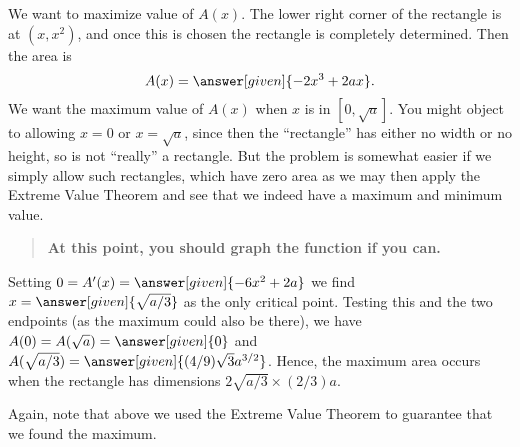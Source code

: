\documentclass{ximera}
\begin{document}
\begin{example}
\begin{image}
\end{image}
\begin{explanation}
We want to maximize value of $A(x)$.  The lower right corner of the
rectangle is at $(x,x^2)$, and once this is chosen the rectangle is
completely determined. Then the area is
\[
A(x)=\answer[given]{-2x^3+2ax}.
\] 
We want the maximum value of $A(x)$ when $x$ is in $[0,\sqrt{a}]$. You
might object to allowing $x=0$ or $x=\sqrt{a}$, since then the
``rectangle'' has either no width or no height, so is not ``really'' a
rectangle. But the problem is somewhat easier if we simply allow such
rectangles, which have zero area as we may then apply the Extreme
Value Theorem and see that we indeed have a maximum and minimum value.
\begin{quote}
  \textbf{At this point, you should graph the function if you can.}
\end{quote}
Setting $0=A'(x)=\answer[given]{-6x^2+2a}$ we find
$x=\answer[given]{\sqrt{a/3}}$ as the only critical point. Testing
this and the two endpoints (as the maximum could also be there), we
have $A(0)=A(\sqrt{a})=\answer[given]{0}$ and
$A(\sqrt{a/3})=\answer[given]{(4/9)\sqrt{3}a^{3/2}}$. Hence, the maximum area
occurs when the rectangle has dimensions $2\sqrt{a/3}\times (2/3)a$.
\end{explanation}
\end{example}

Again, note that above we used the Extreme Value Theorem to guarantee
that we found the maximum.
\end{document}
